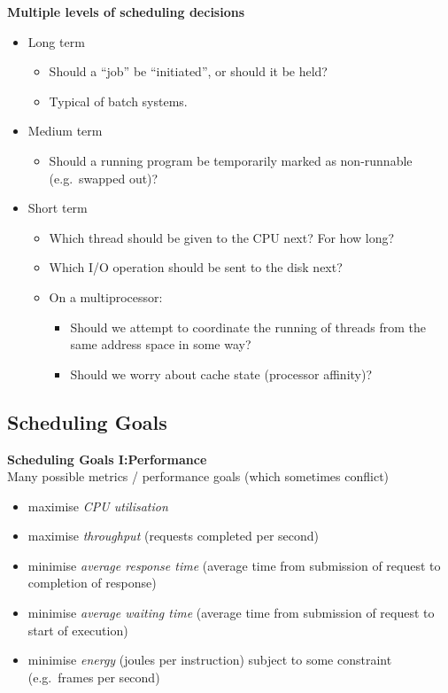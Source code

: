 \documentclass[11pt,a4paper]{article}
\begin{document}
\textbf{Multiple levels of scheduling decisions}
\begin{itemize}
    \item Long term
        \begin{itemize}
            \item Should a ``job'' be ``initiated'', or should it be held?
            \item Typical of batch systems.
        \end{itemize}
    \item Medium term
        \begin{itemize}
            \item Should a running program be temporarily marked as non-runnable
                (e.g.\ swapped out)?
        \end{itemize}
    \item Short term
        \begin{itemize}
            \item Which thread should be given to the CPU next?
                For how long?
            \item Which I/O operation should be sent to the disk next?
            \item On a multiprocessor:
                \begin{itemize}
                    \item Should we attempt to coordinate the running of threads from the same
                        address space in some way?
                    \item Should we worry about cache state (processor affinity)?
                \end{itemize}
        \end{itemize}
\end{itemize}

\subsection{Scheduling Goals}

\textbf{Scheduling Goals I:\@ Performance} \\
Many possible metrics / performance goals (which sometimes conflict)
\begin{itemize}
    \item maximise \emph{CPU utilisation}
    \item maximise \emph{throughput} (requests completed per second)
    \item minimise \emph{average response time} (average time from submission of request to
        completion of response)
    \item minimise \emph{average waiting time} (average time from submission of request to
        start of execution)
    \item minimise \emph{energy} (joules per instruction) subject to some constraint
        (e.g.\ frames per second)
\end{itemize}
\end{document}
